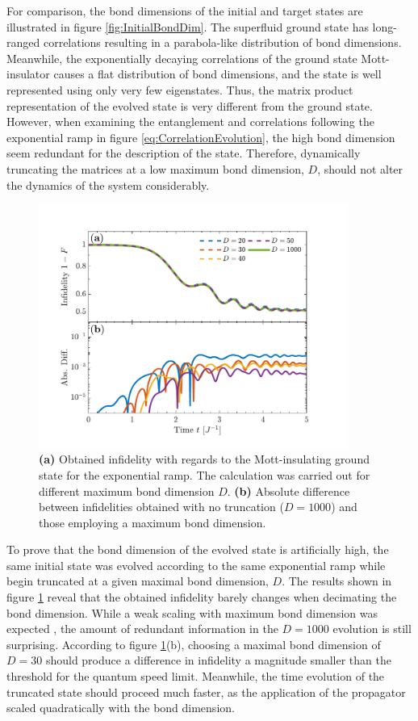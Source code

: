 For comparison, the bond dimensions of the initial and target states are illustrated in figure \ref{fig:InitialBondDim}. The superfluid ground state has long-ranged correlations resulting in a parabola-like distribution of bond dimensions. Meanwhile, the exponentially decaying correlations of the ground state Mott-insulator causes a flat distribution of bond dimensions, and the state is well represented using only very few eigenstates. Thus, the matrix product representation of the evolved state is very different from the ground state. However, when examining the entanglement and correlations following the exponential ramp in figure \ref{eq:CorrelationEvolution}, the high bond dimension seem redundant for the description of the state. Therefore, dynamically truncating the matrices at a low maximum bond dimension, $D$, should not alter the dynamics of the system considerably.

\begin{figure}[h!]
    \centering
    \includegraphics[width=0.9\textwidth]{Figures/L20/FidelityTruncation.pdf}
    \caption{ \textbf{(a)} Obtained infidelity with regards to the Mott-insulating ground state for the exponential ramp. The calculation was carried out for different maximum bond dimension $D$. \textbf{(b)} Absolute difference between infidelities obtained with no truncation ($D = 1000$) and those employing a maximum bond dimension.  }
    \label{fig:FidelityTruncation}
\end{figure}
To prove that the bond dimension of the evolved state is artificially high, the same initial state was evolved according to the same exponential ramp while begin truncated at a given maximal bond dimension, $D$. The results shown in figure \ref{fig:FidelityTruncation} reveal that the obtained infidelity barely changes when decimating the bond dimension. While a weak scaling with maximum bond dimension was expected \cite{Daley2004}, the amount of redundant information in the $D = 1000$ evolution is still surprising. According to figure \ref{fig:FidelityTruncation}(b), choosing a maximal bond dimension of $D = 30$ should produce a difference in infidelity a magnitude smaller than the threshold for the quantum speed limit. Meanwhile, the time evolution of the truncated state should proceed much faster, as the application of the propagator scaled quadratically with the bond dimension.

